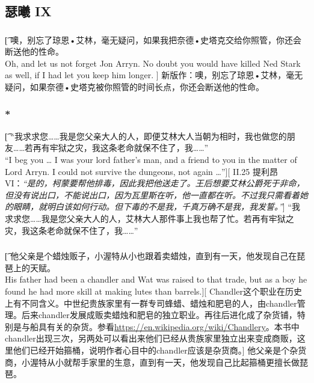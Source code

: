 \documentclass[12pt,a4paper]{article}
\begin{document}
\subsection{瑟曦 IX}
\subsubsection{}\t[
	噢，别忘了琼恩•艾林，毫无疑问，如果我把奈德•史塔克交给你照管，你还会断送他的性命。\\
	Oh, and let us not forget Jon Arryn. No doubt you would have killed Ned Stark as well, if I had let you keep him longer. ]
	新版作：噢，别忘了琼恩•艾林，毫无疑问，如果奈德•史塔克被你照管的时间长点，你还会断送他的性命。
	
\subsubsection{\color{red}*}\t[
	“我求求您……我是您父亲大人的人，即便艾林大人当朝为相时，我也做您的朋友……若再有牢狱之灾，我这条老命就保不住了，我……”\\
	“I beg you … I was your lord father's man, and a friend to you in the matter of Lord Arryn. I could not survive the dungeons, not again …”][
	II.25 提利昂 VI：\emph{“是的，柯蒙要帮他排毒，因此我把他送走了。王后想要艾林公爵死于非命，但没有说出口，不能说出口，因为瓦里斯在听，他一直都在听。不过我只需看着她的眼睛，就明白该如何行动。但下毒的不是我，千真万确不是我，我发誓。”}]
	“我求求您……我是您父亲大人的人，艾林大人那件事上我也帮了忙。若再有牢狱之灾，我这条老命就保不住了，我……”
	
\subsubsection{}\t[
	他父亲是个蜡烛贩子，小渥特从小也跟着卖蜡烛，直到有一天，他发现自己在琵琶上的天赋。\\
	His father had been a chandler and Wat was raised to that trade, but as a boy he found he had more skill at making lutes than barrels.][
	Chandler这个职业在历史上有不同含义。中世纪贵族家里有一群专司蜂蜡、蜡烛和肥皂的人，由chandler管理。后来chandler发展成贩卖蜡烛和肥皂的独立职业。再往后进化成了杂货铺，特别是与船具有关的杂货。参看\url{https://en.wikipedia.org/wiki/Chandlery}。本书中chandler出现三次，另两处可以看出来他们已经从贵族家里独立出来变成商贩，这里他们已经开始箍桶，说明作者心目中的chandler应该是杂货商。]
	他父亲是个杂货商，小渥特从小就帮手家里的生意，直到有一天，他发现自己比起箍桶更擅长做琵琶。
	
\end{document}
